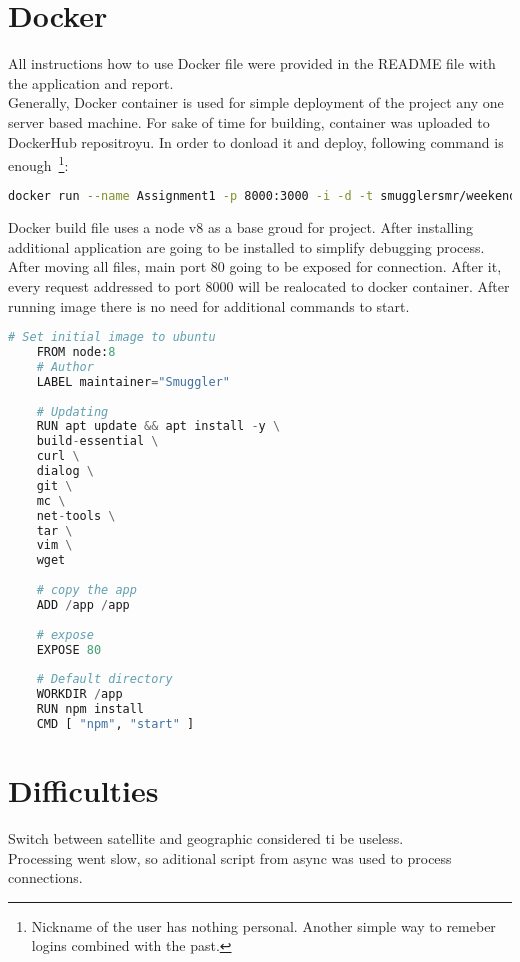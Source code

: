\documentclass[12pt]{article}
\numberwithin{equation}{section} %
\numberwithin{figure}{section} %
\numberwithin{table}{section} %
\begin{document}
\section{Docker}
	All instructions how to use Docker file were provided in the README file with the application and report.\\
	Generally, Docker container is used for simple deployment of the project any one server based machine. For sake of time for building, container was uploaded to DockerHub repositroyu. In order to donload it and deploy, following command is enough~\footnote{Nickname of the user has nothing personal. Another simple way to remeber logins combined with the past.}:
	\begin{lstlisting}[language=bash]
	docker run --name Assignment1 -p 8000:3000 -i -d -t smugglersmr/weekends-pl
	\end{lstlisting}
	Docker build file uses a node v8 as a base groud for project. After installing additional application are going to be installed to simplify debugging process. After moving all files, main port 80 going to be exposed for connection. After it, every request addressed to port 8000 will be realocated  to docker container. After running image there is no need for additional commands to start.
	\begin{lstlisting}[language=Python]
	# Set initial image to ubuntu
	FROM node:8
	# Author
	LABEL maintainer="Smuggler"
	
	# Updating
	RUN apt update && apt install -y \
	build-essential \
	curl \
	dialog \
	git \
	mc \
	net-tools \
	tar \
	vim \
	wget
	
	# copy the app
	ADD /app /app
	
	# expose
	EXPOSE 80
	
	# Default directory
	WORKDIR /app
	RUN npm install
	CMD [ "npm", "start" ]	
	\end{lstlisting}
%	

\section{Difficulties}
	Switch between satellite and geographic considered ti be useless. \\
	Processing went slow, so aditional script from async was used to process connections.
\end{document}
